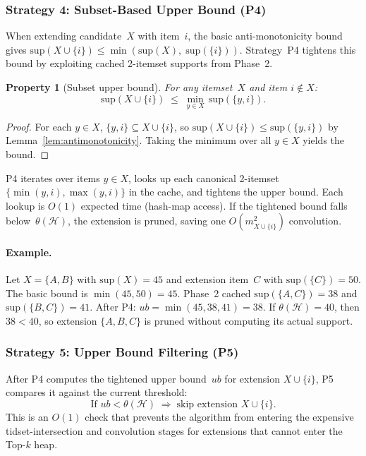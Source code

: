 \documentclass[10pt,letterpaper]{article}
\newtheorem{property}{Property}
\begin{document}
\subsubsection*{Strategy 4: Subset-Based Upper Bound (P4)}

When extending candidate~$X$ with item~$i$, the basic anti-monotonicity
bound gives $\mathrm{sup}(X \cup \{i\}) \le \min(\mathrm{sup}(X),\;
\mathrm{sup}(\{i\}))$. Strategy~P4 tightens this bound by exploiting
cached 2-itemset supports from Phase~2.

\begin{property}[Subset upper bound]
\label{prop:subset_ub}
For any itemset~$X$ and item $i \notin X$:
\begin{equation}
\mathrm{sup}(X \cup \{i\}) \;\le\; \min_{y \in X}\, \mathrm{sup}(\{y, i\}).
\label{eq:subset_ub}
\end{equation}
\end{property}

\begin{proof}
For each $y \in X$, $\{y, i\} \subseteq X \cup \{i\}$, so
$\mathrm{sup}(X \cup \{i\}) \le \mathrm{sup}(\{y, i\})$ by
Lemma~\ref{lem:antimonotonicity}. Taking the minimum over all
$y \in X$ yields the bound.
\end{proof}

P4 iterates over items $y \in X$, looks up each canonical 2-itemset
$\{\min(y,i), \max(y,i)\}$ in the cache, and tightens the upper bound.
Each lookup is $O(1)$ expected time (hash-map access). If the tightened
bound falls below~$\theta(\mathcal{H})$, the extension is pruned,
saving one $O(m_{X \cup \{i\}}^2)$ convolution.

\paragraph{Example.} Let $X = \{A, B\}$ with $\mathrm{sup}(X) = 45$
and extension item~$C$ with $\mathrm{sup}(\{C\}) = 50$. The basic
bound is $\min(45, 50) = 45$. Phase~2 cached
$\mathrm{sup}(\{A, C\}) = 38$ and $\mathrm{sup}(\{B, C\}) = 41$.
After P4: $ub = \min(45, 38, 41) = 38$. If
$\theta(\mathcal{H}) = 40$, then $38 < 40$, so extension
$\{A, B, C\}$ is pruned without computing its actual support.

\subsubsection*{Strategy 5: Upper Bound Filtering (P5)}

After P4 computes the tightened upper bound~$ub$ for extension
$X \cup \{i\}$, P5 compares it against the current threshold:
\begin{equation}
\text{If } ub < \theta(\mathcal{H}) \;\Rightarrow\;
\text{skip extension } X \cup \{i\}.
\end{equation}
This is an $O(1)$ check that prevents the algorithm from entering the
expensive tidset-intersection and convolution stages for extensions that
cannot enter the Top-$k$ heap.
\end{document}
